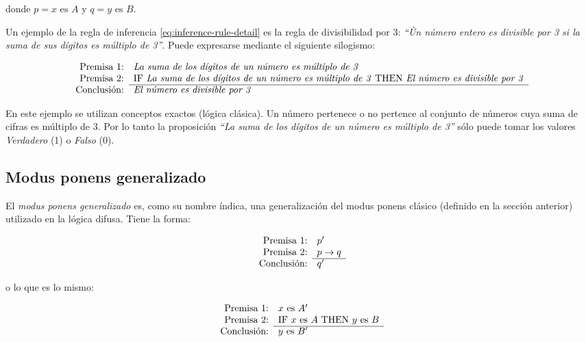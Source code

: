 donde $p = x \text{ es } A$ y $q = y \text{ es } B$.

\begin{example}
Un ejemplo de la regla de inferencia \ref{eq:inference-rule-detail} es la regla de divisibilidad por 3: \emph{``Ùn número entero es divisible por 3 si la suma de sus dígitos es múltiplo de 3''}. Puede expresarse mediante el siguiente silogismo:

\begin{equation}
\normalfont
\begin{array}{rl}
\text{Premisa 1:} & \text{\emph{La suma de los dígitos de un número es múltiplo de 3}} \\
\text{Premisa 2:} & \text{IF \emph{La suma de los dígitos de un número es múltiplo de 3} THEN \emph{El número es divisible por 3}} \\
\cline{2-2}
\text{Conclusión:} & \text{\emph{El número es divisible por 3}}
\end{array}
\label{eq:inference-rule-example}
\end{equation}

En este ejemplo se utilizan conceptos exactos (lógica clásica). Un número pertenece o no pertence al conjunto de números cuya suma de cifras es múltiplo de 3. Por lo tanto la proposición \emph{``La suma de los dígitos de un número es múltiplo de 3''} sólo puede tomar los valores \emph{Verdadero} (1) o \emph{Falso} (0). 
\end{example}

\subsection{Modus ponens generalizado}

El \emph{modus ponens generalizado} es, como su nombre índica, una generalización del modus ponens clásico (definido en la sección anterior) utilizado en la lógica difusa. Tiene la forma:

\begin{equation}
\begin{array}{rl}
\text{Premisa 1:} & p' \\
\text{Premisa 2:} & p \to q \\
\cline{2-2}
\text{Conclusión:} & q'
\end{array}
\label{eq:fuzzy-inference-rule}
\end{equation}

o lo que es lo mismo:

\begin{equation}
\begin{array}{rl}
\text{Premisa 1:} & x \text{ es } A' \\
\text{Premisa 2:} & \text{IF } x \text{ es } A \text{ THEN } y \text{ es } B \\
\cline{2-2}
\text{Conclusión:} & y \text{ es } B'
\end{array}
\label{eq:fuzzy-inference-rule-detail}
\end{equation}


